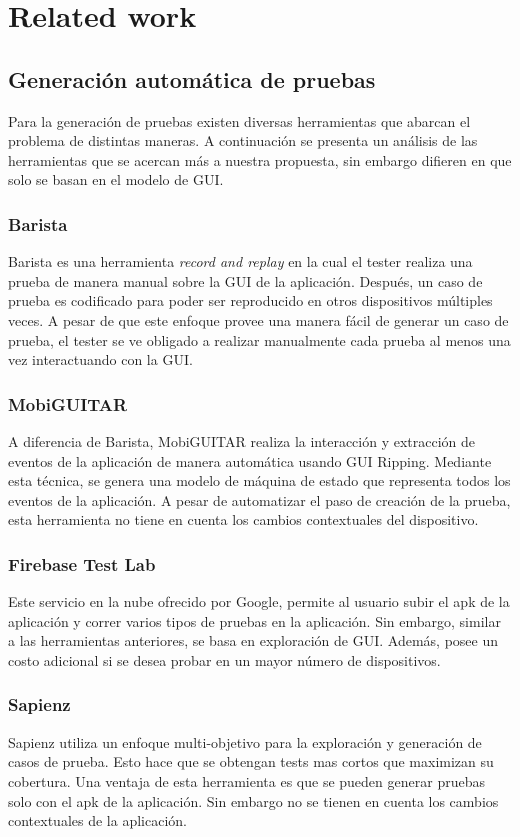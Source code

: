 %
\chapter{Related work}
\label{chapter2}

\section{Generación automática de pruebas}
Para la generación de pruebas existen diversas herramientas que abarcan el problema de distintas maneras. A continuación se presenta un análisis de las herramientas que se acercan más a nuestra propuesta, sin embargo difieren en que solo se basan en el modelo de GUI.

\subsection{Barista}
Barista \cite{Fazzini2017} es una herramienta \textit{record and replay} en la cual el tester realiza una prueba de manera manual sobre la GUI de la aplicación. Después, un caso de prueba es codificado para poder ser reproducido en otros dispositivos múltiples veces. A pesar de que este enfoque provee una manera fácil de generar un caso de prueba, el tester se ve obligado a realizar manualmente cada prueba al menos una vez interactuando con la GUI.

\subsection{MobiGUITAR}
A diferencia de Barista, MobiGUITAR \cite{MobiGUITAR} realiza la interacción y extracción de eventos de la aplicación de manera automática usando GUI Ripping. Mediante esta técnica, se genera una modelo de máquina de estado que representa todos los eventos de la aplicación. A pesar de automatizar el paso de creación de la prueba, esta herramienta no tiene en cuenta los cambios contextuales del dispositivo.

\subsection{Firebase Test Lab}
Este servicio \cite{firebase} en la nube ofrecido por Google, permite al usuario subir el apk de la aplicación y correr varios tipos de pruebas en la aplicación. Sin embargo, similar a las herramientas anteriores, se basa en exploración de GUI. Además, posee un costo adicional si se desea probar en un mayor número de dispositivos.

\subsection{Sapienz}
Sapienz\cite{sapienz} utiliza un enfoque multi-objetivo para la exploración y generación de casos de prueba. Esto hace que se obtengan tests mas cortos que maximizan	 su cobertura. Una ventaja de esta herramienta es que se pueden generar pruebas solo con el apk de la aplicación. Sin embargo no se tienen en cuenta los cambios contextuales de la aplicación.
